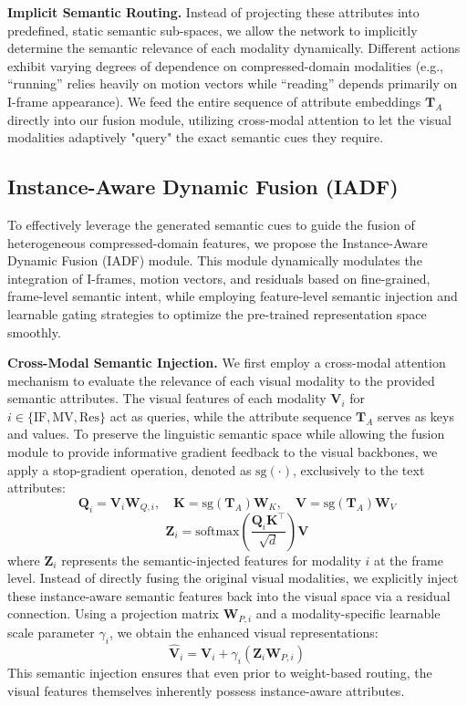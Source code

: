 \documentclass[letterpaper]{article} %
\begin{document}
\noindent\textbf{Implicit Semantic Routing.} 
Instead of projecting these attributes into predefined, static semantic sub-spaces, we allow the network to implicitly determine the semantic relevance of each modality dynamically. Different actions exhibit varying degrees of dependence on compressed-domain modalities (e.g., ``running'' relies heavily on motion vectors while ``reading'' depends primarily on I-frame appearance). We feed the entire sequence of attribute embeddings $\mathbf{T}_A$ directly into our fusion module, utilizing cross-modal attention to let the visual modalities adaptively "query" the exact semantic cues they require.

\subsection{Instance-Aware Dynamic Fusion (IADF)}
\label{sec:fusion}

To effectively leverage the generated semantic cues to guide the fusion of heterogeneous compressed-domain features, we propose the Instance-Aware Dynamic Fusion (IADF) module. This module dynamically modulates the integration of I-frames, motion vectors, and residuals based on fine-grained, frame-level semantic intent, while employing feature-level semantic injection and learnable gating strategies to optimize the pre-trained representation space smoothly.

\noindent\textbf{Cross-Modal Semantic Injection.} 
We first employ a cross-modal attention mechanism to evaluate the relevance of each visual modality to the provided semantic attributes. The visual features of each modality $\mathbf{V}_i$ for $i \in \{\text{IF}, \text{MV}, \text{Res}\}$ act as queries, while the attribute sequence $\mathbf{T}_A$ serves as keys and values. To preserve the linguistic semantic space while allowing the fusion module to provide informative gradient feedback to the visual backbones, we apply a stop-gradient operation, denoted as $\text{sg}(\cdot)$, exclusively to the text attributes:
$$\mathbf{Q}_i = \mathbf{V}_i\mathbf{W}_{Q,i}, \quad \mathbf{K} = \text{sg}(\mathbf{T}_A)\mathbf{W}_K, \quad \mathbf{V} = \text{sg}(\mathbf{T}_A)\mathbf{W}_V$$
$$\mathbf{Z}_i = \text{softmax}\left(\frac{\mathbf{Q}_i \mathbf{K}^\top}{\sqrt{d}}\right)\mathbf{V}$$
where $\mathbf{Z}_i$ represents the semantic-injected features for modality $i$ at the frame level. Instead of directly fusing the original visual modalities, we explicitly inject these instance-aware semantic features back into the visual space via a residual connection. Using a projection matrix $\mathbf{W}_{P,i}$ and a modality-specific learnable scale parameter $\gamma_i$, we obtain the enhanced visual representations:
$$\hat{\mathbf{V}}_i = \mathbf{V}_i + \gamma_i (\mathbf{Z}_i \mathbf{W}_{P,i})$$
This semantic injection ensures that even prior to weight-based routing, the visual features themselves inherently possess instance-aware attributes.
\end{document}
